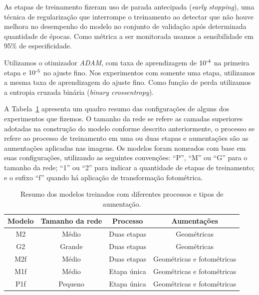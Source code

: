 \documentclass[12pt]{article}
\begin{document}
As etapas de treinamento fizeram uso de parada antecipada (\emph{early stopping}), uma técnica de regularização que interrompe o treinamento ao detectar que não houve melhora no desempenho do modelo no conjunto de validação após determinada quantidade de épocas. Como métrica a ser monitorada usamos a sensibilidade em 95\% de especificidade.

Utilizamos o otimizador \emph{ADAM}, com taxa de aprendizagem de $10\textsuperscript{-4}$ na primeira etapa e $10\textsuperscript{-5}$ no ajuste fino. Nos experimentos com somente uma etapa, utilizamos a mesma taxa de aprendizagem do ajuste fino. Como função de perda utilizamos a entropia cruzada binária (\emph{binary crossentropy}).

A Tabela~\ref{tab:modelos_class_binaria} apresenta um quadro resumo das configurações de alguns dos experimentos que fizemos. O tamanho da rede se refere as camadas superiores adotadas na construção do modelo conforme descrito anteriormente, o processo se refere ao processo de treinamento em uma ou duas etapas e aumentações são as aumentações aplicadas nas imagens. Os modelos foram nomeados com base em suas configurações, utilizando as seguintes convenções: ``P'', ``M'' ou ``G'' para o tamanho da rede; ``1'' ou ``2'' para indicar a quantidade de etapas de treinamento; e o sufixo ``f'' quando há aplicação de transformação fotométrica.


\begin{table}[h]
\centering
\begin{tabular}{cccc}
\toprule
\textbf{Modelo} & \textbf{Tamanho da rede} & \textbf{Processo} & \textbf{Aumentações} \\ 
\midrule
M2  & Médio   & Duas etapas  & Geométricas \\                %
G2  & Grande  & Duas etapas  & Geométricas \\                %
M2f & Médio   & Duas etapas  & Geométricas e fotométricas \\ %
M1f & Médio   & Etapa única  & Geométricas e fotométricas \\ %
P1f & Pequeno & Etapa única  & Geométricas e fotométricas \\ %
\bottomrule
\end{tabular}
\caption{Resumo dos modelos treinados com diferentes processos e tipos de aumentação.}
\label{tab:modelos_class_binaria}
\end{table}
\end{document}
